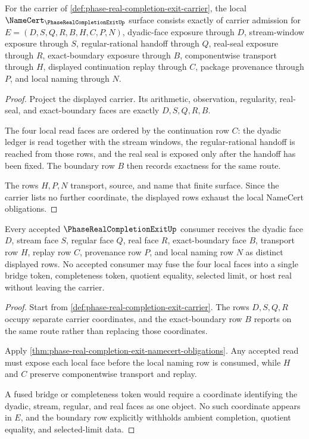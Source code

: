 \begin{theorem}
\label{thm:phase-real-completion-exit-namecert-obligations}
For the carrier of \autoref{def:phase-real-completion-exit-carrier}, the local $\NameCert_{\PhaseRealCompletionExitUp}$ surface consists exactly of carrier admission for $E=(D,S,Q,R,B,H,C,P,N)$, dyadic-face exposure through $D$, stream-window exposure through $S$, regular-rational handoff through $Q$, real-seal exposure through $R$, exact-boundary exposure through $B$, componentwise transport through $H$, displayed continuation replay through $C$, package provenance through $P$, and local naming through $N$.
\end{theorem}
\begin{proof}
Project the displayed carrier. Its arithmetic, observation, regularity, real-seal, and exact-boundary faces are exactly $D,S,Q,R,B$.

The four local read faces are ordered by the continuation row $C$: the dyadic ledger is read together with the stream windows, the regular-rational handoff is reached from those rows, and the real seal is exposed only after the handoff has been fixed. The boundary row $B$ then records exactness for the same route.

The rows $H,P,N$ transport, source, and name that finite surface. Since the carrier lists no further coordinate, the displayed rows exhaust the local NameCert obligations.
\end{proof}

\begin{theorem}
\label{thm:phase-real-completion-exit-noncollapse-boundary}
Every accepted $\PhaseRealCompletionExitUp$ consumer receives the dyadic face $D$, stream face $S$, regular face $Q$, real face $R$, exact-boundary face $B$, transport row $H$, replay row $C$, provenance row $P$, and local naming row $N$ as distinct displayed rows. No accepted consumer may fuse the four local faces into a single bridge token, completeness token, quotient equality, selected limit, or host real without leaving the carrier.
\end{theorem}
\begin{proof}
Start from \autoref{def:phase-real-completion-exit-carrier}. The rows $D,S,Q,R$ occupy separate carrier coordinates, and the exact-boundary row $B$ reports on the same route rather than replacing those coordinates.

Apply \autoref{thm:phase-real-completion-exit-namecert-obligations}. Any accepted read must expose each local face before the local naming row is consumed, while $H$ and $C$ preserve componentwise transport and replay.

A fused bridge or completeness token would require a coordinate identifying the dyadic, stream, regular, and real faces as one object. No such coordinate appears in $E$, and the boundary row explicitly withholds ambient completion, quotient equality, and selected-limit data.
\end{proof}

